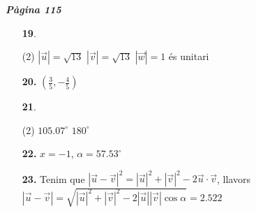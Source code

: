\documentclass[a4paper, pdf, twoside]{book}
\begin{document}
\begin{multicols}{2}

{\textbf{\em Pàgina 115}} \hrulefill
\begin{enumerate}
\vspace{0.25cm}



 \item[\fontfamily{phv}\selectfont\color{blue}\textbf{19}. ] 
 \begin{tasks}[column-sep=1em, item-indent=1.3333em](2)
	 \task $|\vec u|=\sqrt {13}$
	 \task $|\vec v|=\sqrt {13}$
	 \task $|\vec w|=1$ és unitari
\end{tasks}
 \end{enumerate}
\begin{enumerate}
\vspace{0.25cm}
\item[\fontfamily{phv}\selectfont\color{blue}\textbf{20. }] 
$(\frac {3}{5}, -\frac {4}{5})$
\vspace{0.25cm}



 \item[\fontfamily{phv}\selectfont\color{blue}\textbf{21}. ]  \scalebox{0.6}{\simbolclau } 
 \begin{tasks}[column-sep=1em, item-indent=1.3333em](2)
	 \task $105.07^\circ $
	 \task $180^\circ $
\end{tasks}
\vspace{0.25cm}
\item[\fontfamily{phv}\selectfont\color{blue}\textbf{22. }]  \scalebox{0.6}{\simbolclau } 
$x=-1$, $\alpha =57.53^\circ $
\vspace{0.25cm}
\item[\fontfamily{phv}\selectfont\color{blue}\textbf{23. }] 
Tenim que $|\vec u - \vec v|^2=|\vec u|^2 + |\vec v|^2 - 2 \vec u \cdot \vec v$, llavors $|\vec u - \vec v| = \sqrt { |\vec u|^2 + |\vec v|^2 - 2 |\vec u| |\vec v| \cos \alpha }=2.522$ 
 \end{enumerate}
\vspace{0.3cm}



\end{multicols}
\end{document}
